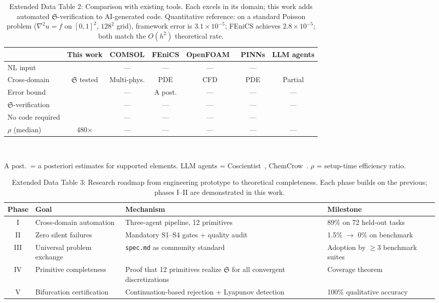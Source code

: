 \documentclass[11pt,a4paper]{article}
\newcommand{\Sclass}{\mathfrak{S}}
\newcommand{\cmark}{\checkmark}
\begin{document}
\begin{table}[htbp]
\centering
\caption{Extended Data Table 2: Comparison with existing tools. Each excels in its domain; this work adds automated $\Sclass$-verification to AI-generated code. Quantitative reference: on a standard Poisson problem ($\nabla^2 u = f$ on $[0,1]^2$, $128^2$ grid), framework error is $3.1 \times 10^{-5}$; FEniCS achieves $2.8 \times 10^{-5}$; both match the $O(h^2)$ theoretical rate.}
\label{tab:tool_comparison}
\small
\begin{tabularx}{\textwidth}{lcccccc}
\toprule
& \textbf{This work} & \textbf{COMSOL} & \textbf{FEniCS} & \textbf{OpenFOAM}~\cite{jasak2007openfoam} & \textbf{PINNs} & \textbf{LLM agents} \\
\midrule
NL input & \cmark & --- & --- & --- & --- & \cmark \\
Cross-domain & $\Sclass$ tested & Multi-phys. & PDE & CFD & PDE & Partial \\
Error bound & \cmark & --- & A post. & --- & --- & --- \\
$\Sclass$-verification & \cmark & --- & --- & --- & --- & --- \\
No code required & \cmark & --- & --- & --- & --- & \cmark \\
$\rho$ (median) & 480$\times$ & --- & --- & --- & --- & --- \\
\bottomrule
\end{tabularx}\\[3pt]
\raggedright\scriptsize A post.\ = a posteriori estimates for supported elements. LLM agents = Coscientist~\cite{boiko2023coscientist}, ChemCrow~\cite{bran2024chemcrow}. $\rho$ = setup-time efficiency ratio.
\end{table}

\begin{table}[htbp]
\centering
\caption{Extended Data Table 3: Research roadmap from engineering prototype to theoretical completeness. Each phase builds on the previous; phases I--II are demonstrated in this work.}
\label{tab:roadmap}
\small
\begin{tabularx}{\textwidth}{clXl}
\toprule
\textbf{Phase} & \textbf{Goal} & \textbf{Mechanism} & \textbf{Milestone} \\
\midrule
I & Cross-domain automation & Three-agent pipeline, 12 primitives & 89\% on 72 held-out tasks \\
II & Zero silent failures & Mandatory S1--S4 gates + quality audit & 1.5\% $\to$ 0\% on benchmark \\
III & Universal problem exchange & \texttt{spec.md} as community standard & Adoption by $\geq$3 benchmark suites \\
IV & Primitive completeness & Proof that 12 primitives realize $\Sclass$ for all convergent discretizations & Coverage theorem \\
V & Bifurcation certification & Continuation-based rejection + Lyapunov detection & 100\% qualitative accuracy \\
\bottomrule
\end{tabularx}
\end{table}
\end{document}
